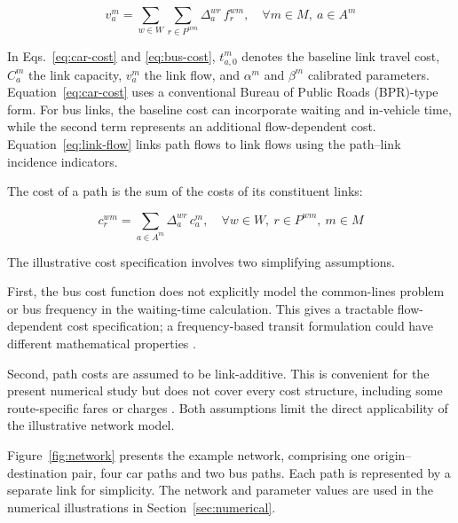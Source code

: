 \documentclass[11pt,a4paper]{article}
\begin{document}
\begin{equation}
v_a^m=\sum_{w\in W}\sum_{r\in P^{wm}}\Delta_a^{wr}\,f_r^{wm},\quad \forall m\in M,\ a\in A^m
\label{eq:link-flow}
\end{equation}

In Eqs.~\eqref{eq:car-cost} and \eqref{eq:bus-cost}, $t_{a,0}^m$ denotes the baseline link travel cost, $C_a^m$ the link capacity, $v_a^m$ the link flow, and $\alpha^m$ and $\beta^m$ calibrated parameters. Equation~\eqref{eq:car-cost} uses a conventional Bureau of Public Roads (BPR)-type form. For bus links, the baseline cost can incorporate waiting and in-vehicle time, while the second term represents an additional flow-dependent cost. Equation~\eqref{eq:link-flow} links path flows to link flows using the path--link incidence indicators.

The cost of a path is the sum of the costs of its constituent links:

\begin{equation}
c_r^{wm}=\sum_{a\in A^m}\Delta_a^{wr}\,c_a^m,\quad \forall w\in W,\ r\in P^{wm},\ m\in M
\label{eq:path-cost}
\end{equation}

The illustrative cost specification involves two simplifying assumptions.

First, the bus cost function does not explicitly model the common-lines problem or bus frequency in the waiting-time calculation. This gives a tractable flow-dependent cost specification; a frequency-based transit formulation could have different mathematical properties \citep{szeto2014,jiang2016}.

Second, path costs are assumed to be link-additive. This is convenient for the present numerical study but does not cover every cost structure, including some route-specific fares or charges \citep{han2004}. Both assumptions limit the direct applicability of the illustrative network model.

Figure~\ref{fig:network} presents the example network, comprising one origin--destination pair, four car paths and two bus paths. Each path is represented by a separate link for simplicity. The network and parameter values are used in the numerical illustrations in Section~\ref{sec:numerical}.
\end{document}
